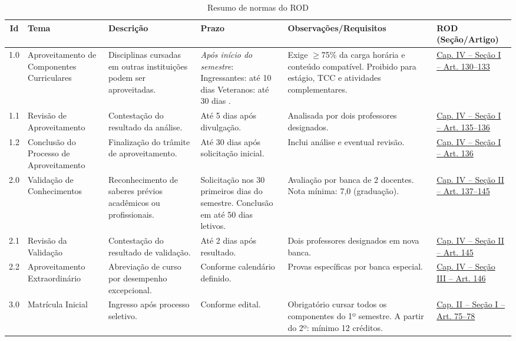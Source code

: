 \documentclass[authoryear]{elsarticle}
\begin{document}
\begin{longtable}{|c|p{3cm}|p{3cm}|p{3.5cm}|p{3.5cm}|p{2cm}|}  
	\caption{Resumo de normas do ROD\label{tab:prazos_rod}} \\
	\hline 
	\textbf{Id} & \textbf{Tema} & \textbf{Descrição} & \textbf{Prazo} & \textbf{Observações/Requisitos} & \textbf{ROD (Seção/Artigo)} \\
	\hline
	1.0 & Aproveitamento de Componentes Curriculares & Disciplinas cursadas em outras instituições podem ser aproveitadas. & \textit{Após início do semestre}: Ingressantes: até 10 dias Veteranos: até 30 dias . & Exige $\geq$75\% da carga horária e conteúdo compatível. Proibido para estágio, TCC e atividades complementares. & \href{https://github.com/JonathaCosta-IA/CCECA/blob/main/02_Rod_atualizado1.pdf}{Cap. IV – Seção I – Art. 130--133} \\
	\hline
	1.1 & Revisão de Aproveitamento & Contestação do resultado da análise. & Até 5 dias após divulgação. & Analisada por dois professores designados. & \href{https://github.com/JonathaCosta-IA/CCECA/blob/main/02_Rod_atualizado1.pdf}{Cap. IV – Seção I – Art. 135--136} \\
	\hline
	1.2 & Conclusão do Processo de Aproveitamento & Finalização do trâmite de aproveitamento. & Até 30 dias após solicitação inicial. & Inclui análise e eventual revisão. & \href{https://github.com/JonathaCosta-IA/CCECA/blob/main/02_Rod_atualizado1.pdf}{Cap. IV – Seção I – Art. 136} \\
	\hline
	2.0 & Validação de Conhecimentos & Reconhecimento de saberes prévios acadêmicos ou profissionais. & Solicitação nos 30 primeiros dias do semestre. Conclusão em até 50 dias letivos. & Avaliação por banca de 2 docentes. Nota mínima: 7,0 (graduação). & \href{https://github.com/JonathaCosta-IA/CCECA/blob/main/02_Rod_atualizado1.pdf}{Cap. IV – Seção II – Art. 137--145} \\
	\hline
	2.1 & Revisão da Validação & Contestação do resultado de validação. & Até 2 dias após resultado. & Dois professores designados em nova banca. & \href{https://github.com/JonathaCosta-IA/CCECA/blob/main/02_Rod_atualizado1.pdf}{Cap. IV – Seção II – Art. 145} \\
	\hline
	2.2 & Aproveitamento Extraordinário & Abreviação de curso por desempenho excepcional. & Conforme calendário definido. & Provas específicas por banca especial. & \href{https://github.com/JonathaCosta-IA/CCECA/blob/main/02_Rod_atualizado1.pdf}{Cap. IV – Seção III – Art. 146} \\
	\hline
	3.0 & Matrícula Inicial & Ingresso após processo seletivo. & Conforme edital. & Obrigatório cursar todos os componentes do 1º semestre. A partir do 2º: mínimo 12 créditos. & \href{https://github.com/JonathaCosta-IA/CCECA/blob/main/02_Rod_atualizado1.pdf}{Cap. II – Seção I – Art. 75--78} \\

\end{longtable}
\end{document}
